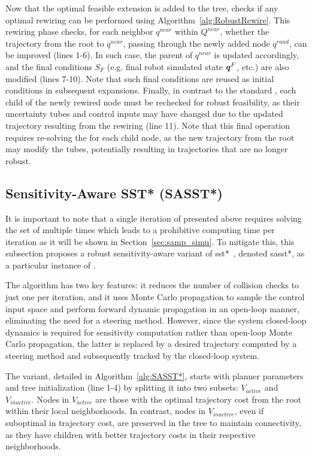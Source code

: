 Now that the optimal feasible extension is added to the tree,  checks if any optimal rewiring can be performed using Algorithm~\ref{alg:RobustRewire}.
This rewiring phase checks, for each neighbor $q^{near}$ within $Q^{near}$, whether the trajectory from the root to $q^{near}$, passing through the newly added node $q^{rand}$, can be improved (lines 1-6).
In such case, the parent of $q^{near}$ is updated accordingly, and the final  conditions $S_F$ (e.g. final robot simulated state $\boldsymbol{q}^F$, etc.) are also modified (lines 7-10).
Note that such final conditions are reused as initial conditions in subsequent expansions.
Finally, in contrast to the standard , each child of the newly rewired node must be rechecked for robust feasibility, as their uncertainty tubes and control inputs may have changed due to the updated trajectory resulting from the rewiring (line 11).
Note that this final operation requires re-solving the  for each child node, as the new trajectory from the root may modify the tubes, potentially resulting in trajectories that are no longer robust.

\subsection{Sensitivity-Aware SST* (SASST*)}\label{sec:sasst*}

It is important to note that a single iteration of  presented above requires solving the set of  multiple times which leads to a prohibitive computing time per iteration as it will be shown in Section~\ref{sec:samp_simu}.
To mitigate this, this subsection proposes a robust sensitivity-aware variant of \gls{sst*}~\cite{cSST}, denoted \gls{sasst*}, as a particular instance of . 

The  algorithm has two key features: it reduces the number of collision checks to just one per iteration, and it uses Monte Carlo propagation to sample the control input space and perform forward dynamic propagation in an open-loop manner, eliminating the need for a steering method.
However, since the system closed-loop dynamics is required for sensitivity computation rather than open-loop Monte Carlo propagation, the latter is replaced by a desired trajectory computed by a steering method and subsequently tracked by the closed-loop system.

The  variant, detailed in Algorithm~\ref{alg:SASST*}, starts with planner parameters and tree initialization (line 1-4) by splitting it into two subsets: $V_{active}$ and $V_{inactive}.$
Nodes in $V_{active}$ are those with the optimal trajectory cost from the root within their local neighborhoods. 
In contrast, nodes in $V_{inactive}$, even if suboptimal in trajectory cost, are preserved in the tree to maintain connectivity, as they have children with better trajectory costs in their respective neighborhoods. 

